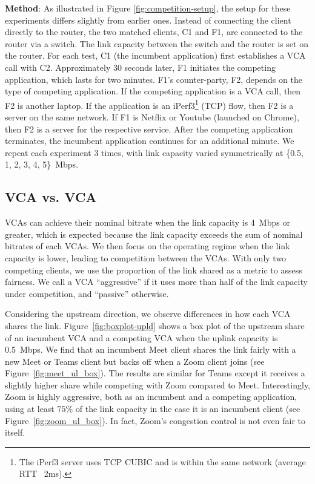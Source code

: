 \noindent \textbf{Method}: As illustrated in Figure \ref{fig:competition-setup}, the setup for these experiments differs slightly from earlier ones. 
Instead of connecting the client directly to the router, the two matched clients, C1 and F1, are connected to the router via a switch. 
The link capacity between the switch and the router is set on the router. For each test, C1 (the incumbent application) first establishes a VCA call with C2.
Approximately 30 seconds later, F1 initiates the competing application, which lasts for two minutes.
F1's counter-party, F2, depends on the type of competing application.
If the competing application is a VCA call, then F2 is another laptop.
If the application is an iPerf3\footnote{The iPerf3 server uses TCP CUBIC and is  within the same network (average RTT ~2ms).} (TCP) flow, then F2 is a server on the same network.
  If F1 is Netflix or Youtube (launched on Chrome), then F2 is a server for the respective service. 
After the competing application terminates, the incumbent application continues for an additional minute.
We repeat each experiment 3 times, with link capacity varied symmetrically at \{0.5, 1, 2, 3, 4, 5\}~Mbps.

\subsection{VCA vs. VCA}

VCAs can achieve their nominal bitrate when the link capacity is
4~Mbps or greater, which is expected because the link capacity exceeds the sum of
nominal bitrates of each VCAs. We then focus on the operating regime when the link
capacity is lower, leading to competition between the VCAs. 
With only two competing clients, we use the proportion of the link shared as a
metric to assess fairness. We call a VCA ``aggressive'' if it uses more than
half of the link capacity under competition, and ``passive'' otherwise.

Considering the upstream direction, we observe differences in how each VCA shares the
link. Figure~\ref{fig:boxplot-upld} shows a box plot of the upstream share of
an incumbent VCA and a competing VCA when the uplink capacity is 0.5~Mbps.  We
find that an incumbent Meet client shares the link fairly with a new Meet or
Teams client but backs off when a Zoom client joins (see
Figure~\ref{fig:meet_ul_box}). The results are similar for Teams except it
receives a slightly higher share while competing with Zoom compared to Meet.
Interestingly, Zoom is highly aggressive, both as an incumbent and a competing
application, using at least $75\%$ of the link capacity in the case it is an
incumbent client (see Figure~\ref{fig:zoom_ul_box}). In fact, Zoom's
congestion control is not even fair to itself.

